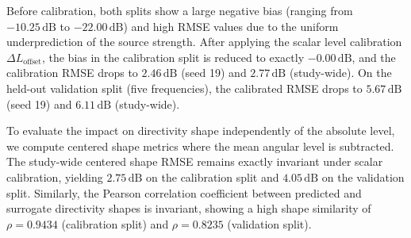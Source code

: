 \documentclass[11pt]{article}
\begin{document}
\begin{table}[htbp]
\centering
\caption{Theory--surrogate validation metrics before and after scalar level calibration for the representative validation case (target seed 19) and the study-wide aggregated target set (50 targets).}
\label{tab:calibration_separability}
\end{table}

Before calibration, both splits show a large negative bias (ranging from $-10.25\,\mathrm{dB}$ to $-22.00\,\mathrm{dB}$) and high RMSE values due to the uniform underprediction of the source strength. After applying the scalar level calibration $\Delta L_{\mathrm{offset}}$, the bias in the calibration split is reduced to exactly $-0.00\,\mathrm{dB}$, and the calibration RMSE drops to $2.46\,\mathrm{dB}$ (seed 19) and $2.77\,\mathrm{dB}$ (study-wide). On the held-out validation split (five frequencies), the calibrated RMSE drops to $5.67\,\mathrm{dB}$ (seed 19) and $6.11\,\mathrm{dB}$ (study-wide).

To evaluate the impact on directivity shape independently of the absolute level, we compute centered shape metrics where the mean angular level is subtracted. The study-wide centered shape RMSE remains exactly invariant under scalar calibration, yielding $2.75\,\mathrm{dB}$ on the calibration split and $4.05\,\mathrm{dB}$ on the validation split. Similarly, the Pearson correlation coefficient between predicted and surrogate directivity shapes is invariant, showing a high shape similarity of $\rho = 0.9434$ (calibration split) and $\rho = 0.8235$ (validation split).
\end{document}
